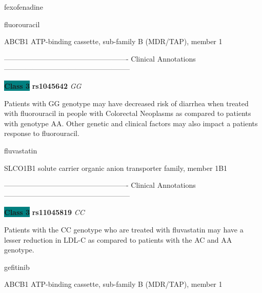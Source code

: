 \documentclass{resume} %
\begin{document}
\begin{rSection}{ fexofenadine }
\end{rSection}\begin{rSection}{ fluorouracil }
\item[]

\begin{rSubsection}{ ABCB1 }{ ATP-binding cassette, sub-family B (MDR/TAP), member 1 }{}{}
\item[]

\item[] ---------------------------------------------------- Clinical Annotations -----------------------------------------------------\newline
\item \textbf{\colorbox{teal} {Class 3}} \textbf{ rs1045642 } \textit{ GG }
\item[] Patients with GG genotype may have decreased risk of diarrhea when treated with fluorouracil in people with Colorectal Neoplasms as compared to patients with genotype AA. Other genetic and clinical factors may also impact a patients response to fluorouracil.
\end{rSubsection}

\end{rSection}\begin{rSection}{ fluvastatin }
\item[]

\begin{rSubsection}{ SLCO1B1 }{ solute carrier organic anion transporter family, member 1B1 }{}{}
\item[]

\item[] ---------------------------------------------------- Clinical Annotations -----------------------------------------------------\newline
\item \textbf{\colorbox{teal} {Class 3}} \textbf{ rs11045819 } \textit{ CC }
\item[] Patients with the CC genotype who are treated with fluvastatin may have a lesser reduction in LDL-C as compared to patients with the AC and AA genotype.
\end{rSubsection}

\end{rSection}\begin{rSection}{ gefitinib }
\item[]

\begin{rSubsection}{ ABCB1 }{ ATP-binding cassette, sub-family B (MDR/TAP), member 1 }{}{}
\item[]


\end{rSubsection}
\end{rSection}
\end{document}
